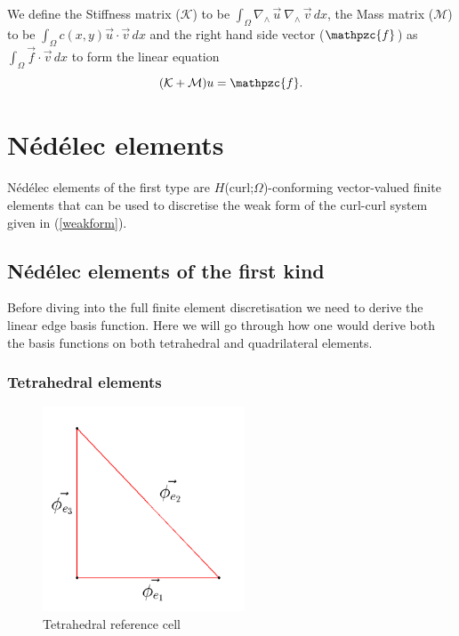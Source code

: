 \documentclass[14pt]{extarticle}
\numberwithin{equation}{section}    %
\newcommand{\curl}{\ensuremath{\nabla_{\wedge}\,}}
\renewcommand{\u}{\vec u}
\newcommand{\f}{\vec f}
\renewcommand{\v}{\vec v}
\renewcommand{\ne}{N\'ed\'elec elements }
\begin{document}
We define the Stiffness matrix ($\mathcal{K}$) to be  $\int_\Omega \curl \u \ \curl \v \, dx$, the Mass matrix ($\mathcal{M}$) to be $ \int_\Omega c(x,y)\u \cdot \v \, dx$ and the right hand side vector ($\mathpzc{f}$) as $\int_\Omega \f \cdot \v \, dx$ to form the linear equation
\begin{equation} \label{eq:MatrixSystem}
    (\mathcal{K}+\mathcal{M}) u = \mathpzc{f}.
\end{equation}

\section{\ne}

\ne  of the first type \cite{Nedelec1980} are $H$(curl;$\Omega$)-conforming vector-valued finite elements that can be used to discretise the weak form of the curl-curl system given in (\ref{weakform}).



\subsection{\ne  of the first kind }

Before diving into the full finite element discretisation we need to derive the linear edge basis function. Here we will go through how one would derive both the basis functions on both tetrahedral and quadrilateral elements.

\subsubsection{Tetrahedral elements}




\begin{figure}[h!]
\centering
\includegraphics[width=6cm]{GridFigure/basisFuncsTets}
\caption{Tetrahedral reference cell}
\label{fig:tetBasis}
\end{figure}
\end{document}
